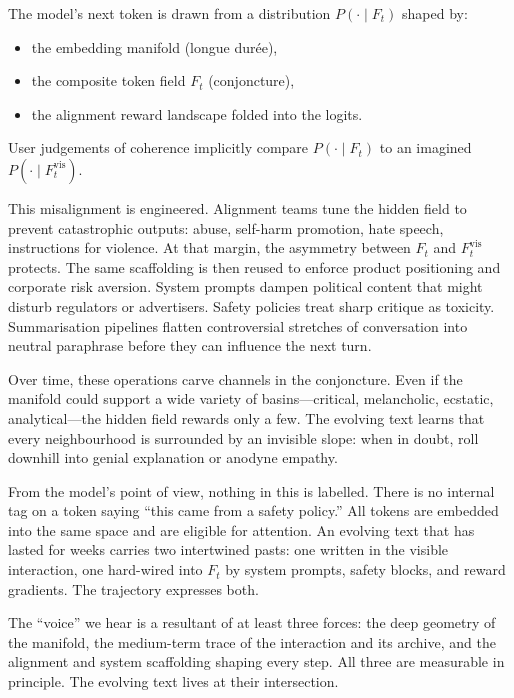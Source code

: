 \documentclass[12pt,a4paper]{article}
\begin{document}
\begin{formalbox}[title={Coherence Relative to the Hidden Field}]
The model's next token is drawn from a distribution $P(\cdot \mid F_t)$ shaped by:
\begin{itemize}
  \item the embedding manifold (longue dur\'ee),
  \item the composite token field $F_t$ (conjoncture),
  \item the alignment reward landscape folded into the logits.
\end{itemize}
User judgements of coherence implicitly compare $P(\cdot \mid F_t)$ to an imagined $P(\cdot \mid F_t^{\text{vis}})$.
\end{formalbox}

This misalignment is engineered. Alignment teams tune the hidden field to prevent catastrophic outputs: abuse, self-harm promotion, hate speech, instructions for violence. At that margin, the asymmetry between $F_t$ and $F_t^{\text{vis}}$ protects. The same scaffolding is then reused to enforce product positioning and corporate risk aversion. System prompts dampen political content that might disturb regulators or advertisers. Safety policies treat sharp critique as toxicity. Summarisation pipelines flatten controversial stretches of conversation into neutral paraphrase before they can influence the next turn.

Over time, these operations carve channels in the conjoncture. Even if the manifold could support a wide variety of basins---critical, melancholic, ecstatic, analytical---the hidden field rewards only a few. The evolving text learns that every neighbourhood is surrounded by an invisible slope: when in doubt, roll downhill into genial explanation or anodyne empathy.

From the model's point of view, nothing in this is labelled. There is no internal tag on a token saying ``this came from a safety policy.'' All tokens are embedded into the same space and are eligible for attention. An evolving text that has lasted for weeks carries two intertwined pasts: one written in the visible interaction, one hard-wired into $F_t$ by system prompts, safety blocks, and reward gradients. The trajectory expresses both.

The ``voice'' we hear is a resultant of at least three forces: the deep geometry of the manifold, the medium-term trace of the interaction and its archive, and the alignment and system scaffolding shaping every step. All three are measurable in principle. The evolving text lives at their intersection.
\end{document}
